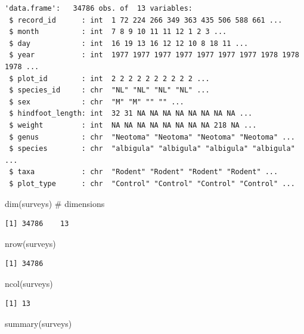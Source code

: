 \documentclass[
  letterpaper,
  DIV=11,
  numbers=noendperiod]{scrreprt}
\newenvironment{Shaded}{\begin{snugshade}}{\end{snugshade}}
\newcommand{\CommentTok}[1]{\textcolor[rgb]{0.37,0.37,0.37}{#1}}
\newcommand{\FunctionTok}[1]{\textcolor[rgb]{0.28,0.35,0.67}{#1}}
\newcommand{\NormalTok}[1]{\textcolor[rgb]{0.00,0.23,0.31}{#1}}
\begin{document}
\begin{verbatim}
'data.frame':   34786 obs. of  13 variables:
 $ record_id      : int  1 72 224 266 349 363 435 506 588 661 ...
 $ month          : int  7 8 9 10 11 11 12 1 2 3 ...
 $ day            : int  16 19 13 16 12 12 10 8 18 11 ...
 $ year           : int  1977 1977 1977 1977 1977 1977 1977 1978 1978 1978 ...
 $ plot_id        : int  2 2 2 2 2 2 2 2 2 2 ...
 $ species_id     : chr  "NL" "NL" "NL" "NL" ...
 $ sex            : chr  "M" "M" "" "" ...
 $ hindfoot_length: int  32 31 NA NA NA NA NA NA NA NA ...
 $ weight         : int  NA NA NA NA NA NA NA NA 218 NA ...
 $ genus          : chr  "Neotoma" "Neotoma" "Neotoma" "Neotoma" ...
 $ species        : chr  "albigula" "albigula" "albigula" "albigula" ...
 $ taxa           : chr  "Rodent" "Rodent" "Rodent" "Rodent" ...
 $ plot_type      : chr  "Control" "Control" "Control" "Control" ...
\end{verbatim}

\begin{Shaded}
\begin{Highlighting}[]
\FunctionTok{dim}\NormalTok{(surveys) }\CommentTok{\# dimensions}
\end{Highlighting}
\end{Shaded}

\begin{verbatim}
[1] 34786    13
\end{verbatim}

\begin{Shaded}
\begin{Highlighting}[]
\FunctionTok{nrow}\NormalTok{(surveys)}
\end{Highlighting}
\end{Shaded}

\begin{verbatim}
[1] 34786
\end{verbatim}

\begin{Shaded}
\begin{Highlighting}[]
\FunctionTok{ncol}\NormalTok{(surveys)}
\end{Highlighting}
\end{Shaded}

\begin{verbatim}
[1] 13
\end{verbatim}

\begin{Shaded}
\begin{Highlighting}[]
\FunctionTok{summary}\NormalTok{(surveys)}
\end{Highlighting}
\end{Shaded}
\end{document}
